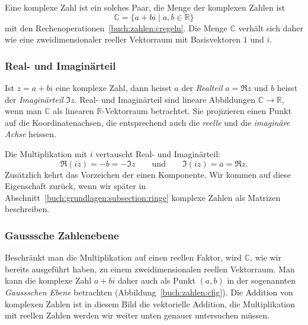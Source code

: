 Eine komplexe Zahl ist ein solches Paar, die Menge der komplexen Zahlen
ist
\[
\mathbb{C}
=
\{a+bi\;|\;a,b\in\mathbb{R}\}
\]
mit den Rechenoperationen~\eqref{buch:zahlen:cregeln}.
Die Menge $\mathbb{C}$ verhält sich daher wie eine zweidimensionaler
reeller Vektorraum mit Basisvektoren $1$ und $i$.

\subsubsection{Real- und Imaginärteil}
Ist $z=a+bi$ eine komplexe Zahl, dann heisst $a$ der {\em Realteil} $a=\Re z$
%
und $b$ heisst der {\em Imaginärteil} $\Im z$.
%
Real- und Imaginärteil sind lineare Abbildungen $\mathbb{C}\to\mathbb{R}$,
wenn man $\mathbb{C}$ als linearen $\mathbb{R}$-Vektorraum betrachtet.
Sie projizieren einen Punkt auf die Koordinatenachsen, die entsprechend
auch die {\em reelle} und die {\em imaginäre Achse} heissen.
%
%

Die Multiplikation mit $i$ vertauscht Real- und Imaginärteil:
\[
\Re (iz)
=
-b
=
-\Im z
\qquad\text{und}\qquad
\Im (iz)
=
a
=
\Re z.
\]
Zusätzlich kehrt das Vorzeichen der einen Komponente.
Wir kommen auf diese Eigenschaft zurück, wenn wir später in
Abschnitt~\ref{buch:grundlagen:subsection:ringe}
komplexe Zahlen als Matrizen beschreiben.

\subsubsection{Gausssche Zahlenebene}
Beschränkt man die Multiplikation auf einen reellen Faktor, wird $\mathbb{C}$,
wie wir bereits ausgeführt haben,
zu einem zweidimensionalen reellen Vektorraum.
Man kann die komplexe Zahl $a+bi$ daher auch als Punkt $(a,b)$ in der
sogenannten {\em Gaussschen Ebene} betrachten (Abbildung~\ref{buch:zahlen:cfig}).
%
Die Addition von komplexen Zahlen ist in diesem Bild die vektorielle
Addition, die Multiplikation mit reellen Zahlen werden wir weiter unten
genauer untersuchen müssen.

